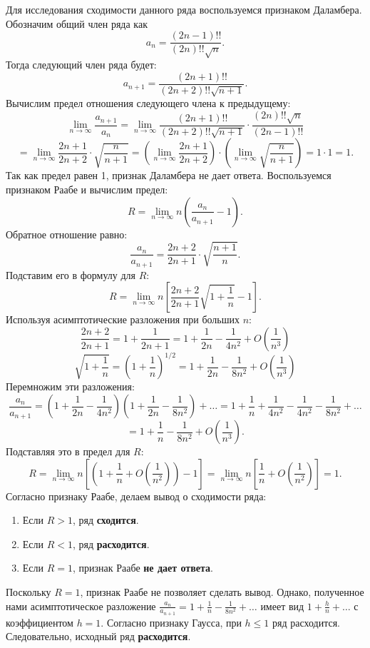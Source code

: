 \documentclass[a4paper, 12pt]{report}
\numberwithin{equation}{section}
\begin{document}
	Для исследования сходимости данного ряда воспользуемся признаком Даламбера. Обозначим общий член ряда как
	$$ a_n = \frac{(2n-1)!!}{(2n)!! \sqrt{n}}. $$
	Тогда следующий член ряда будет:
	$$ a_{n+1} = \frac{(2n+1)!!}{(2n+2)!! \sqrt{n+1}}. $$
	Вычислим предел отношения следующего члена к предыдущему:
	$$ \lim_{n \to \infty} \frac{a_{n+1}}{a_n} = \lim_{n \to \infty} \frac{(2n+1)!!}{(2n+2)!! \sqrt{n+1}} \cdot \frac{(2n)!! \sqrt{n}}{(2n-1)!!} $$
	$$ = \lim_{n \to \infty} \frac{2n+1}{2n+2} \cdot \sqrt{\frac{n}{n+1}} = \left(\lim_{n \to \infty} \frac{2n+1}{2n+2}\right) \cdot \left(\lim_{n \to \infty} \sqrt{\frac{n}{n+1}}\right) = 1 \cdot 1 = 1. $$
	Так как предел равен 1, признак Даламбера не дает ответа. Воспользуемся признаком Раабе и вычислим предел:
	$$ R = \lim_{n \to \infty} n \left( \frac{a_n}{a_{n+1}} - 1 \right). $$
	Обратное отношение равно:
	$$ \frac{a_n}{a_{n+1}} = \frac{2n+2}{2n+1} \cdot \sqrt{\frac{n+1}{n}}. $$
	Подставим его в формулу для $R$:
	$$ R = \lim_{n \to \infty} n \left[ \frac{2n+2}{2n+1} \sqrt{1+\frac{1}{n}} - 1 \right]. $$
	Используя асимптотические разложения при больших $n$:
	$$ \frac{2n+2}{2n+1} = 1 + \frac{1}{2n+1} = 1 + \frac{1}{2n} - \frac{1}{4n^2} + O\left(\frac{1}{n^3}\right) $$
	$$ \sqrt{1+\frac{1}{n}} = \left(1+\frac{1}{n}\right)^{1/2} = 1 + \frac{1}{2n} - \frac{1}{8n^2} + O\left(\frac{1}{n^3}\right) $$
	Перемножим эти разложения:
	$$ \frac{a_n}{a_{n+1}} = \left(1 + \frac{1}{2n} - \frac{1}{4n^2}\right)\left(1 + \frac{1}{2n} - \frac{1}{8n^2}\right) + \ldots = 1 + \frac{1}{n} + \frac{1}{4n^2} - \frac{1}{4n^2} - \frac{1}{8n^2} + \ldots $$
	$$ = 1 + \frac{1}{n} - \frac{1}{8n^2} + O\left(\frac{1}{n^3}\right). $$
	Подставляя это в предел для $R$:
	$$ R = \lim_{n \to \infty} n \left[ \left(1 + \frac{1}{n} + O\left(\frac{1}{n^2}\right)\right) - 1 \right] = \lim_{n \to \infty} n \left[ \frac{1}{n} + O\left(\frac{1}{n^2}\right) \right] = 1. $$
	Согласно признаку Раабе, делаем вывод о сходимости ряда:
	\begin{enumerate}
		\item Если $R > 1$, ряд \textbf{сходится}.
		\item Если $R < 1$, ряд \textbf{расходится}.
		\item Если $R = 1$, признак Раабе \textbf{не дает ответа}.
	\end{enumerate}
	Поскольку $R=1$, признак Раабе не позволяет сделать вывод. Однако, полученное нами асимптотическое разложение $\frac{a_n}{a_{n+1}} = 1 + \frac{1}{n} - \frac{1}{8n^2} + \ldots$ имеет вид $1 + \frac{h}{n} + \ldots$ с коэффициентом $h=1$. Согласно признаку Гаусса, при $h \le 1$ ряд расходится. Следовательно, исходный ряд \textbf{расходится}.
\end{document}
